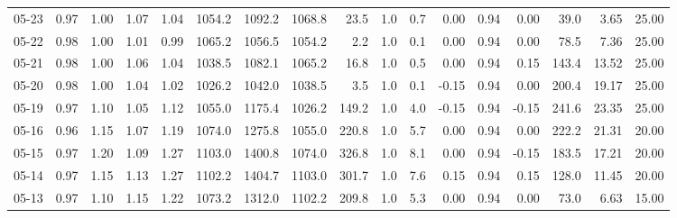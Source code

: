 \begin{threeparttable}
{\begin{tabular}{lrrrrrrrrrrrrrrrr}
  05-23 &         0.97 &           1.00 &          1.07 &          1.04 & 1054.2 & 1092.2 & 1068.8 &       23.5 &                      1.0 &                 0.7 &       0.00 &      0.94 &           0.00 &             39.0 &            3.65 &                  25.00 \\
  05-22 &         0.98 &           1.00 &          1.01 &          0.99 & 1065.2 & 1056.5 & 1054.2 &        2.2 &                      1.0 &                 0.1 &       0.00 &      0.94 &           0.00 &             78.5 &            7.36 &                  25.00 \\
  05-21 &         0.98 &           1.00 &          1.06 &          1.04 & 1038.5 & 1082.1 & 1065.2 &       16.8 &                      1.0 &                 0.5 &       0.00 &      0.94 &           0.15 &            143.4 &           13.52 &                  25.00 \\
  05-20 &         0.98 &           1.00 &          1.04 &          1.02 & 1026.2 & 1042.0 & 1038.5 &        3.5 &                      1.0 &                 0.1 &      -0.15 &      0.94 &           0.00 &            200.4 &           19.17 &                  25.00 \\
  05-19 &         0.97 &           1.10 &          1.05 &          1.12 & 1055.0 & 1175.4 & 1026.2 &      149.2 &                      1.0 &                 4.0 &      -0.15 &      0.94 &          -0.15 &            241.6 &           23.35 &                  25.00 \\
  05-16 &         0.96 &           1.15 &          1.07 &          1.19 & 1074.0 & 1275.8 & 1055.0 &      220.8 &                      1.0 &                 5.7 &       0.00 &      0.94 &           0.00 &            222.2 &           21.31 &                  20.00 \\
  05-15 &         0.97 &           1.20 &          1.09 &          1.27 & 1103.0 & 1400.8 & 1074.0 &      326.8 &                      1.0 &                 8.1 &       0.00 &      0.94 &          -0.15 &            183.5 &           17.21 &                  20.00 \\
  05-14 &         0.97 &           1.15 &          1.13 &          1.27 & 1102.2 & 1404.7 & 1103.0 &      301.7 &                      1.0 &                 7.6 &       0.15 &      0.94 &           0.15 &            128.0 &           11.45 &                  20.00 \\
  05-13 &         0.97 &           1.10 &          1.15 &          1.22 & 1073.2 & 1312.0 & 1102.2 &      209.8 &                      1.0 &                 5.3 &       0.00 &      0.94 &           0.00 &             73.0 &            6.63 &                  15.00 \\

\end{tabular}}
\end{threeparttable}
